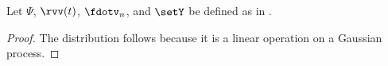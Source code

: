 \begin{lemma}
\label{lem:fdotv_N}
Let $\Psi$, $\rvv(t)$, $\fdotv_n$, and $\setY$ be defined as in .
\end{lemma}
\begin{proof}
  The distribution follows because it is a linear operation on a Gaussian process.
\end{proof}

